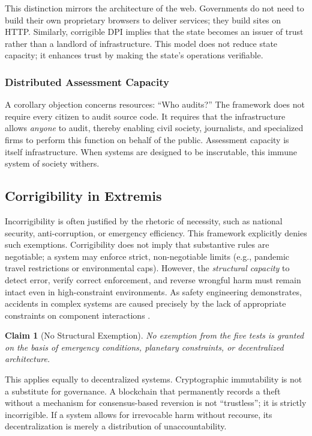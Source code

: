 \documentclass{article}
\newtheorem{claim}{Claim}[section]
\begin{document}
This distinction mirrors the architecture of the web. Governments do not need to build their own proprietary browsers to deliver services; they build sites on HTTP. Similarly, corrigible DPI implies that the state becomes an issuer of trust rather than a landlord of infrastructure. This model does not reduce state capacity; it enhances trust by making the state's operations verifiable.

\subsubsection{Distributed Assessment Capacity}
A corollary objection concerns resources: ``Who audits?'' The framework does not require every citizen to audit source code. It requires that the infrastructure allows \textit{anyone} to audit, thereby enabling civil society, journalists, and specialized firms to perform this function on behalf of the public. Assessment capacity is itself infrastructure. When systems are designed to be inscrutable, this immune system of society withers.

\subsection{Corrigibility in Extremis}

Incorrigibility is often justified by the rhetoric of necessity, such as national security, anti-corruption, or emergency efficiency. This framework explicitly denies such exemptions. Corrigibility does not imply that substantive rules are negotiable; a system may enforce strict, non-negotiable limits (e.g., pandemic travel restrictions or environmental caps). However, the \textit{structural capacity} to detect error, verify correct enforcement, and reverse wrongful harm must remain intact even in high-constraint environments. As safety engineering demonstrates, accidents in complex systems are caused precisely by the lack of appropriate constraints on component interactions \citep{leveson2011}.

\begin{claim}[No Structural Exemption]
\label{claim:no-exemption}
No exemption from the five tests is granted on the basis of emergency conditions, planetary constraints, or decentralized architecture.
\end{claim}

This applies equally to decentralized systems. Cryptographic immutability is not a substitute for governance. A blockchain that permanently records a theft without a mechanism for consensus-based reversion is not ``trustless''; it is strictly incorrigible. If a system allows for irrevocable harm without recourse, its decentralization is merely a distribution of unaccountability.
\end{document}
